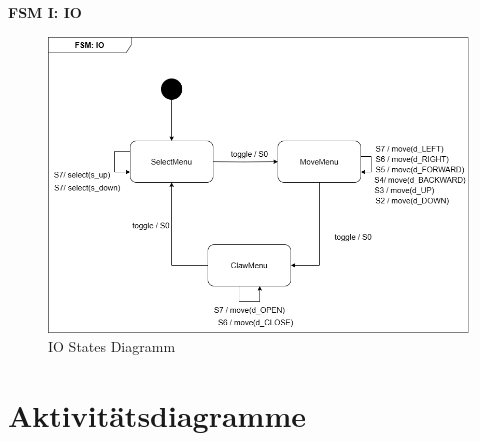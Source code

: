 \textbf{FSM I: IO}\\
\begin{figure}[h]  
    \centering
    \includegraphics[width=0.8\linewidth]{diagrams/FSM_IO.drawio.png}
    \caption{IO States Diagramm}
    \label{fig:IO_States_Diagramm}
\end{figure}

\clearpage 
\section{Aktivitätsdiagramme}








